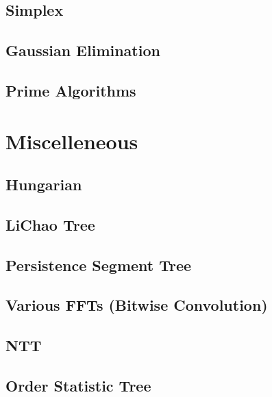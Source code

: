 \documentclass[10pt,landscape,a4paper,twocolumn]{article}
\begin{document}
\subsection{Simplex}


\subsection{Gaussian Elimination}


\subsection{Prime Algorithms}



\section{Miscelleneous}

\subsection{Hungarian}


\subsection{LiChao Tree}


\subsection{Persistence Segment Tree}


\subsection{Various FFTs (Bitwise Convolution)}


\subsection{NTT}


\subsection{Order Statistic Tree}

\end{document}
